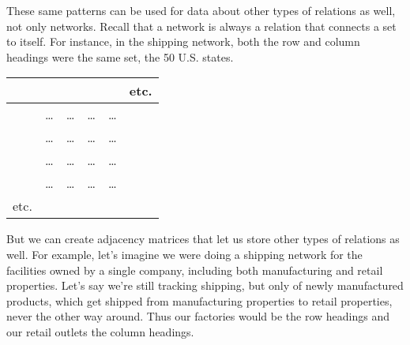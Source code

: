 \documentclass[letterpaper,10pt,english]{sphinxmanual}
\begin{document}
These same patterns can be used for data about other types of relations as well, not only networks.  Recall that a network is always a relation that connects a set to itself.  For instance, in the shipping network, both the row and column headings were the same set, the 50 U.S. states.


\begin{savenotes}\sphinxattablestart
\centering
\begin{tabulary}{\linewidth}[t]{|T|T|T|T|T|T|}
\hline


&\sphinxstyletheadfamily 
{}
&\sphinxstyletheadfamily 
{}
&\sphinxstyletheadfamily 
{}
&\sphinxstyletheadfamily 
{}
&\sphinxstyletheadfamily 
etc.
\\
\hline
{}
&
…
&
…
&
…
&
…
&

\\
\hline
{}
&
…
&
…
&
…
&
…
&

\\
\hline
{}
&
…
&
…
&
…
&
…
&

\\
\hline
{}
&
…
&
…
&
…
&
…
&

\\
\hline
etc.
&

&

&

&

&

\\
\hline
\end{tabulary}
\par
\sphinxattableend\end{savenotes}

But we can create adjacency matrices that let us store other types of relations as well.  For example, let’s imagine we were doing a shipping network for the facilities owned by a single company, including both manufacturing and retail properties.  Let’s say we’re still tracking shipping, but only of newly manufactured products, which get shipped from manufacturing properties to retail properties, never the other way around.  Thus our factories would be the row headings and our retail outlets the column headings.
\end{document}
